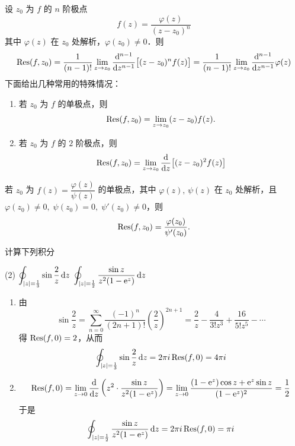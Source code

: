 \documentclass[12pt, a4paper, oneside, UTF8]{ctexbook}
\begin{document}
\begin{theorem}[极点的留数公式]

   设 $z_0$ 为 $f$ 的 $n$ 阶极点
    \[
    f(z)=\frac{\varphi(z)}{(z-z_0)^n}
    \]
    其中 $\varphi(z)$ 在 $z_0$ 处解析，$\varphi(z_0)\neq 0$．则
    \[
    \Res(f,z_0) = \frac{1}{(n-1)!}\lim_{z\to z_0}\frac{\d^{n-1}}{\d z^{n-1}}\bigl[(z-z_0)^n f(z)\bigr] = \frac{1}{(n-1)!}\lim_{z\to z_0}\frac{\d^{n-1}}{\d z^{n-1}}\varphi(z)
    \]
    下面给出几种常用的特殊情况：\begin{enumerate}
        \item 若 $z_0$ 为 $f$ 的单极点，则
            \[
            \Res(f,z_0) = \lim_{z\to z_0} (z-z_0) f(z).
            \]
        \item 若 $z_0$ 为 $f$ 的 $2$ 阶极点，则
            \[
            \Res(f,z_0) = \lim_{z\to z_0} \frac{\d}{\d z}\bigl[(z-z_0)^2 f(z)\bigr]
            \]
        \end{enumerate}
\end{theorem}

\begin{theorem}[商的留数公式]
    若 $z_0$ 为 $f(z)=\dfrac{\varphi(z)}{\psi(z)}$ 的单极点，其中 $\varphi(z),\,\psi(z)$ 在 $z_0$ 处解析，且 $\varphi(z_0)\neq 0,\;\psi(z_0)=0,\;\psi'(z_0)\neq 0$，则
            \[
            \Res(f,z_0) = \frac{\varphi(z_0)}{\psi'(z_0)}.
            \]
\end{theorem}

\begin{example}
计算下列积分
\begin{tasks}[label-width=1.5em, label=(\arabic*)](2)
    \task $\displaystyle\oint_{\abs{z}=\frac{1}{3}}\sin\frac{2}{z}\,\mathrm{d} z$
    \task $\displaystyle\oint_{\abs{z}=\frac12}\frac{\sin z}{z^2(1-\mathrm{e}^z)}\,\mathrm{d} z$
\end{tasks}
\begin{solution}
    \begin{enumerate}[label=(\arabic*)]
        \item 由 $$\sin\frac{2}{z} = \sum_{n=0}^{\infty}\frac{(-1)^n}{(2n+1)!}\left(\frac{2}{z}\right)^{2n+1} = \frac{2}{z}-\frac{4}{3!z^3}+\frac{16}{5!z^5}-\cdots$$得 $\Res(f,0) = 2$，从而
        \[\oint_{\abs{z}=\frac{1}{3}}\sin\frac{2}{z}\,\d z = 2\pi i \Res(f,0) = 4\pi i\]
        \item \[\Res(f,0)=\lim_{z\to 0}\frac{\d}{\d z}\left(z^2 \cdot \frac{\sin z}{z^2(1-\e^z)}\right)=\lim_{z\to 0}\frac{(1-\e^z)\cos z+\e^z\sin z}{(1-\e^z)^2}=\frac12\]
        于是
        \[\oint_{\abs{z}=\frac12}\frac{\sin z}{z^2(1-\e^z)}\,\d z = 2\pi i \Res(f,0) = \pi i\]
    \end{enumerate}
\end{solution}

\end{example}
\end{document}
